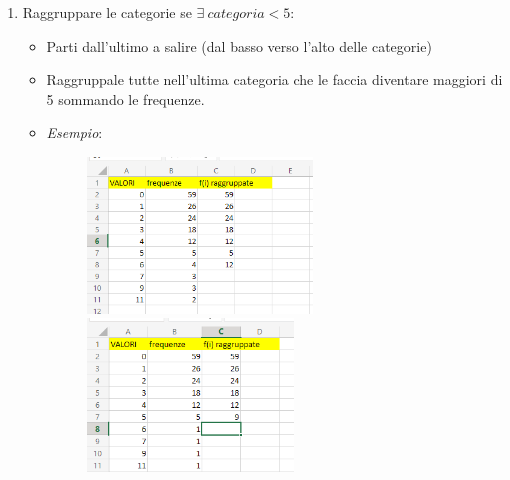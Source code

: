 \begin{enumerate}
    \item Raggruppare le categorie se $\exists \ categoria < 5$:
          \begin{itemize}
              \item Parti dall'ultimo a salire (dal basso verso l'alto delle
                    categorie)
              \item Raggruppale tutte nell'ultima categoria che le faccia
                    diventare maggiori di 5 sommando le frequenze.
              \item \textit{Esempio}:
                    \begin{figure}[H]
                        \centering
                        \includegraphics[width=6cm, keepaspectratio]{capitoli/goodnes_of_fit/imgs/vesceragay.png}
                        \includegraphics[width=5.5cm, keepaspectratio]{capitoli/goodnes_of_fit/imgs/POSTAMOLTOGAY.png}
                    \end{figure}
          \end{itemize}


\end{enumerate}